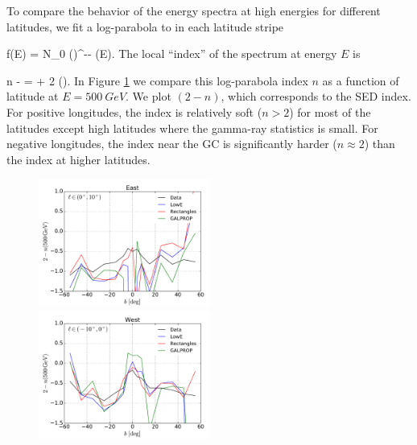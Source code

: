 To compare the behavior of the energy spectra at high energies for different latitudes, 
we fit a log-parabola to  in each latitude stripe

 \be
 f(E) = N_0 \left(\right)^{-\alpha - \beta \ln(E)}.
 \ee
The local ``index'' of the spectrum at energy $E$ is

\be 
{}
n \equiv -  = \alpha + 2 \beta \ln\left(\right).
\ee
In Figure \ref{fig:logpar_index} we compare this log-parabola index $n$ as a function of latitude at $E = \SI{500}{GeV}$. 
We plot $(2 - n)$, which corresponds to the SED index.
For positive longitudes, the index is relatively soft ($n > 2$) for most of the latitudes
except high latitudes where the gamma-ray statistics is small.
For negative longitudes, the index near the GC
is significantly harder ($n \approx 2$) than the index at higher latitudes.
\begin{figure}[h!]
\includegraphics[width=0.5\textwidth]{plots/LogParabola_n(500GeV)_l_in_(0,10).pdf}
\includegraphics[width=0.5\textwidth]{plots/LogParabola_n(500GeV)_l_in_(-10,0).pdf}
\caption{
}
\label{fig:logpar_index}
\end{figure}


